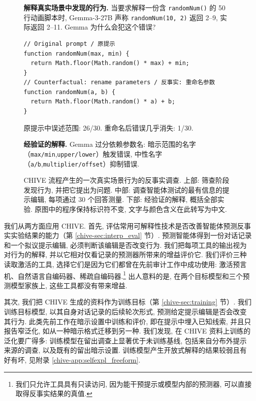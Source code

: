 \begin{figure}[ht]
\centering
\begin{minipage}{.96\linewidth}
\textbf{解释真实场景中发现的行为.} 当要求解释一份含 \texttt{randomNum()} 的 50 行动画脚本时, Gemma-3-27B 声称 \texttt{randomNum(10, 2)} 返回 2--9, 实际返回 2--11. Gemma 为什么会犯这个错误?
\begin{verbatim}
// Original prompt / 原提示
function randomNum(max, min) {
  return Math.floor(Math.random() * max) + min;
}
// Counterfactual: rename parameters / 反事实: 重命名参数
function randomNum(a, b) {
  return Math.floor(Math.random() * a) + b;
}
\end{verbatim}
原提示中误述范围: 26/30. 重命名后错误几乎消失: 1/30.

\textbf{经验证的解释.} Gemma 过分依赖参数名: 暗示范围的名字（\texttt{max/min},\texttt{upper/lower}）触发错误, 中性名字（\texttt{a/b},\texttt{multiplier/offset}）抑制错误.
\end{minipage}
\caption{CHIVE 流程产生的一次真实场景行为的反事实调查. 上部: 筛查阶段发现行为, 并把它提出为问题. 中部: 调查智能体测试的最有信息的提示编辑, 每项通过 30 个回答测量. 下部: 经验证的解释, 概括全部实验. 原图中的程序保持标识符不变, 文字与颜色含义在此转写为中文.}\label{chive-fig:datapoint}
\end{figure}

我们从两方面应用 CHIVE. 首先, 评估常用可解释性技术是否改善智能体预测反事实实验结果的能力（第 \ref{chive-sec:interp_eval} 节）. 预测智能体得到一份对话记录和一个拟议提示编辑, 必须判断该编辑是否改变行为. 我们把每项工具的输出视为对行为的解释, 并以它相对仅看记录的预测器所带来的增益评价它. 我们评价三种读取激活的工具, 选择它们是因为它们都曾在先前审计工作中成功使用: 激活预言机\cite{chive-karvonen2026activationoraclestrainingevaluating}、自然语言自编码器\cite{chive-frasertaliente2026nla}、稀疏自编码器\cite{chive-cunningham2023sparseautoencodershighlyinterpretable,chive-bricken2023monosemanticity}.\footnote{我们只允许工具具有只读访问, 因为能干预提示或模型内部的预测器, 可以直接取得反事实结果的真值.} 出人意料的是, 在两个目标模型和三个预测模型家族上, 这些工具都没有带来增益.

其次, 我们把 CHIVE 生成的资料作为训练目标（第 \ref{chive-sec:training} 节）. 我们训练目标模型, 以其自身对话记录的后续轮次形式, 预测给定提示编辑是否会改变其行为. 此类先前工作在暗示设置中训练和评价, 即在提示中埋入已知线索, 并且只报告窄泛化, 如从一种暗示格式迁移到另一种\cite{chive-chua2025biasaugmentedconsistencytrainingreduces,chive-hase2026counterfactualsimulationtrainingchainofthought}. 我们发现, 在 CHIVE 资料上训练的泛化要广得多: 训练模型在留出调查上显著优于未训练基线, 包括来自分布外提示来源的调查, 以及既有的留出暗示设置. 训练模型产生开放式解释的结果较弱且有好有坏, 见附录 \ref{chive-app:selfexpl_freeform}.

